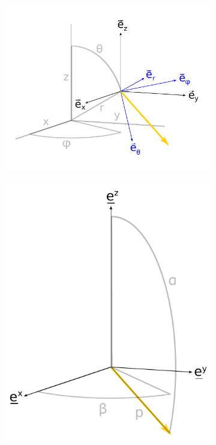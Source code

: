 \begin{figure}
  \centering
  \begin{subfigure}{.5\textwidth}
    \centering
    \includegraphics[width=1\linewidth]{Figures/spherical_polar_map}
  \end{subfigure}
  \begin{subfigure}{.45\textwidth}
    \centering
    \includegraphics[width=0.8\linewidth]{Figures/neutrino_momentum_conventions}

\end{subfigure}
\end{figure}
